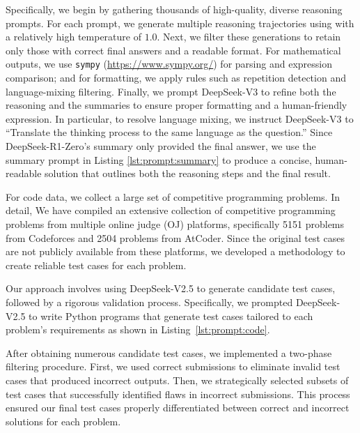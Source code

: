 

Specifically, we begin by gathering thousands of high-quality, diverse reasoning prompts. For each prompt, we generate multiple reasoning trajectories using \dsro{} with a relatively high temperature of $1.0$. Next, we filter these generations to retain only those with correct final answers and a readable format. For mathematical outputs, we use \texttt{sympy} ({\url{https://www.sympy.org/}}) for parsing and expression comparison; and for formatting, we apply rules such as repetition detection and language-mixing filtering. Finally, we prompt DeepSeek-V3 to refine both the reasoning and the summaries to ensure proper formatting and a human-friendly expression.
In particular, to resolve language mixing, we instruct DeepSeek-V3 to ``Translate the thinking process to the same language as the question.'' Since DeepSeek-R1-Zero's summary only provided the final answer, we use the summary prompt in Listing \ref{lst:prompt:summary} to produce a concise, human-readable solution that outlines both the reasoning steps and the final result.

For code data, we collect a large set of competitive programming problems. In detail, We have compiled an extensive collection of competitive programming problems from multiple online judge (OJ) platforms, specifically 5151 problems from Codeforces and 2504 problems from AtCoder. Since the original test cases are not publicly available from these platforms, we developed a methodology to create reliable test cases for each problem.

Our approach involves using DeepSeek-V2.5 to generate candidate test cases, followed by a rigorous validation process. Specifically, we prompted DeepSeek-V2.5 to write Python programs that generate test cases tailored to each problem's requirements as shown in Listing~\ref{lst:prompt:code}.


After obtaining numerous candidate test cases, we implemented a two-phase filtering procedure. First, we used correct submissions to eliminate invalid test cases that produced incorrect outputs. Then, we strategically selected subsets of test cases that successfully identified flaws in incorrect submissions. This process ensured our final test cases properly differentiated between correct and incorrect solutions for each problem. 




